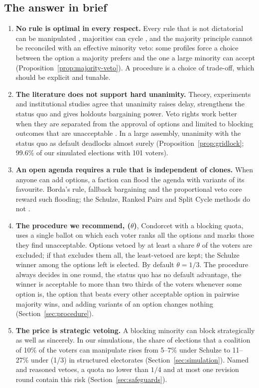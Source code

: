 \subsection{The answer in brief}

\begin{enumerate}
  \item \textbf{No rule is optimal in every respect.} Every rule that is not dictatorial can be
  manipulated \citep{Gibbard1973,Satterthwaite1975}, majorities can cycle \citep{Condorcet1785}, and
  the majority principle cannot be reconciled with an effective minority veto: some profiles force a
  choice between the option a majority prefers and the one a large minority can accept
  (Proposition~\ref{prop:majority-veto}). A procedure is a choice of trade-off, which should be explicit
  and tunable.
  \item \textbf{The literature does not support hard unanimity.} Theory, experiments and institutional
  studies agree that unanimity raises delay, strengthens the status quo and gives holdouts bargaining
  power. Veto rights work better when they are separated from the approval of options and limited to
  blocking outcomes that are unacceptable
  \citep{BoutonLlorenteSaguerMalherbe2018,MiettinenVanberg2025,Tsebelis2002,DziudaLoeper2016}. In a large
  assembly, unanimity with the status quo as default deadlocks almost surely
  (Proposition~\ref{prop:gridlock}; 99.6\% of our simulated elections with 101 voters).
  \item \textbf{An open agenda requires a rule that is independent of clones.} When anyone can add
  options, a faction can flood the agenda with variants of its favourite. Borda's rule, fallback
  bargaining and the proportional veto core reward such flooding; the Schulze, Ranked Pairs and Split
  Cycle methods do not \citep{Tideman1987,Schulze2011,HollidayPacuit2023splitcycle}.
  \item \textbf{The procedure we recommend, \QVC($\theta$)}, Condorcet with a blocking quota, uses a
  single ballot on which each voter ranks all the options and marks those they find unacceptable.
  Options vetoed by at least a share $\theta$ of the voters are excluded; if that excludes them all, the
  least-vetoed are kept; the Schulze winner among the options left is elected. By default
  $\theta = 1/3$. The procedure always decides in one round, the status quo has no default advantage, the
  winner is acceptable to more than two thirds of the voters whenever some option is, the option that
  beats every other acceptable option in pairwise majority wins, and adding variants of an option changes
  nothing (Section~\ref{sec:procedure}).
  \item \textbf{The price is strategic vetoing.} A blocking minority can block strategically as well as
  sincerely. In our simulations, the share of elections that a coalition of 10\% of the voters can
  manipulate rises from 5--7\% under Schulze to 11--27\% under \QVC(1/3) in structured electorates
  (Section~\ref{sec:simulation}). Named and reasoned vetoes, a quota no lower than $1/4$ and at most one
  revision round contain this risk (Section~\ref{sec:safeguards}).
\end{enumerate}


